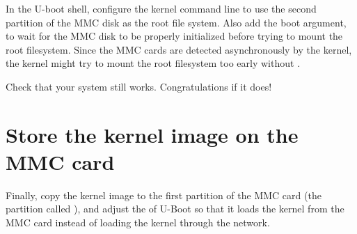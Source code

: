 In the U-boot shell, configure the kernel command line to use the
second partition of the MMC disk as the root file system. Also add the
 boot argument, to wait for the MMC disk to be properly
initialized before trying to mount the root filesystem. Since the MMC
cards are detected asynchronously by the kernel, the kernel might try
to mount the root filesystem too early without .

Check that your system still works. Congratulations if it does!

\section{Store the kernel image on the MMC card}

Finally, copy the  kernel image to the first partition of
the MMC card (the partition called ), and adjust the
 of U-Boot so that it loads the kernel from the MMC card
instead of loading the kernel through the network.
